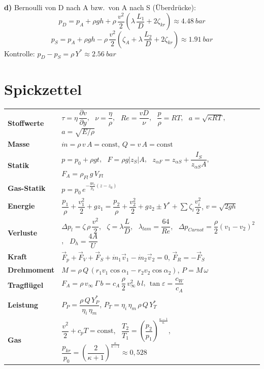 \documentclass[11pt,a4paper]{article}
\begin{document}
\textbf{d)} Bernoulli von D nach A bzw.\ von A nach S (Überdrücke):
\[
p_D = p_A + \rho g h + \rho\,\frac{v^2}{2}\left(\lambda\,\frac{L_1}{D} + 2\zeta_{kr}\right) \approx \SI{4.48}{bar}
\]
\[
p_S = p_A + \rho g h - \rho\,\frac{v^2}{2}\left(\zeta_A + \lambda\,\frac{L_2}{D} + 2\zeta_{kr}\right) \approx \SI{1.91}{bar}
\]
Kontrolle: $p_D - p_S = \rho\,Y^* \approx \SI{2.56}{bar}$ \checkmark

\newpage
\section{Spickzettel}

\renewcommand{\arraystretch}{1.7}
\begin{tabularx}{\linewidth}{@{}>{\sffamily\small\bfseries}p{2.6cm}X@{}}
Stoffwerte & $\tau = \eta\,\dfrac{\partial v}{\partial y}$, \ $\nu = \dfrac{\eta}{\rho}$, \ $Re = \dfrac{v D}{\nu}$, \ $\dfrac{p}{\rho} = R T$, \ $a = \sqrt{\kappa R T}$, \ $a = \sqrt{E/\rho}$ \\
Masse & $\dot m = \rho\,v\,A = \text{const}$, \quad $Q = v\,A = \text{const}$ \\
Statik & $p = p_0 + \rho g t$, \ $F = \rho g |z_S| A$, \ $z_{\alpha F} = z_{\alpha S} + \dfrac{I_S}{z_{\alpha S} A}$, \ $F_A = \rho_{Fl}\,g\,V_{Fl}$ \\
Gas-Statik & $p = p_0\,e^{-\frac{g\rho_0}{p_0}(z - z_0)}$ \\
Energie & $\dfrac{p_1}{\rho} + \dfrac{v_1^2}{2} + g z_1 = \dfrac{p_2}{\rho} + \dfrac{v_2^2}{2} + g z_2 \pm Y^* + \sum \zeta_i \dfrac{v_i^2}{2}$, \quad $v = \sqrt{2gh}$ \\
Verluste & $\Delta p_l = \zeta\,\rho\,\dfrac{v^2}{2}$, \ $\zeta = \lambda\dfrac{L}{D}$, \ $\lambda_{lam} = \dfrac{64}{Re}$, \ $\Delta p_{Carnot} = \dfrac{\rho}{2}(v_1 - v_2)^2$, \ $D_h = \dfrac{4A}{U}$ \\
Kraft & $\vec F_p + \vec F_V + \vec F_S + \dot m_1\vec v_1 - \dot m_2\vec v_2 = 0$, \quad $\vec F_R = -\vec F_S$ \\
Drehmoment & $M = \rho\,Q\,(r_1 v_1\cos\alpha_1 - r_2 v_2\cos\alpha_2)$, \quad $P = M\,\omega$ \\
Tragflügel & $F_A = \rho\,v_\infty\,\Gamma\,b = c_A\,\dfrac{\rho}{2}\,v_\infty^2\,b\,l$, \quad $\tan\varepsilon = \dfrac{c_W}{c_A}$ \\
Leistung & $P_P = \dfrac{\rho\,Q\,Y_P^*}{\eta_i\,\eta_m}$, \quad $P_T = \eta_i\,\eta_m\,\rho\,Q\,Y_T^*$ \\
Gas & $\dfrac{v^2}{2} + c_p T = \text{const}$, \ $\dfrac{T_2}{T_1} = \left(\dfrac{p_2}{p_1}\right)^{\frac{\kappa-1}{\kappa}}$, \ $\dfrac{p_{kr}}{p_0} = \left(\dfrac{2}{\kappa+1}\right)^{\frac{\kappa}{\kappa-1}} \approx 0{,}528$ \\
\end{tabularx}
\renewcommand{\arraystretch}{1}
\end{document}
